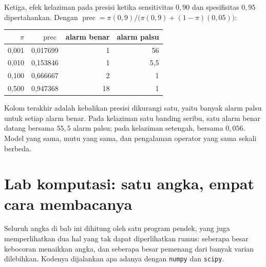 Ketiga, efek kelaziman pada presisi ketika sensitivitas $0{,}90$ dan spesifisitas $0{,}95$
dipertahankan. Dengan $\operatorname{prec}=\pi(0{,}9)/\bigl(\pi(0{,}9)+(1-\pi)(0{,}05)\bigr)$:

\begin{center}
\small
\begin{tabular}{rrrr}
\hline
$\pi$ & $\operatorname{prec}$ & alarm benar & alarm palsu \\
\hline
0,001 & 0,017699 & 1 & 56 \\
0,010 & 0,153846 & 1 & 5,5 \\
0,100 & 0,666667 & 2 & 1 \\
0,500 & 0,947368 & 18 & 1 \\
\hline
\end{tabular}
\end{center}

Kolom terakhir adalah kebalikan presisi dikurangi satu, yaitu banyak alarm palsu untuk
setiap alarm benar. Pada kelaziman satu banding seribu, satu alarm benar datang bersama
$55{,}5$ alarm palsu; pada kelaziman setengah, bersama $0{,}056$. Model yang sama, mutu
yang sama, dan pengalaman operator yang sama sekali berbeda.


\section{Lab komputasi: satu angka, empat cara membacanya}

Seluruh angka di bab ini dihitung oleh satu program pendek, yang juga memperlihatkan dua
hal yang tak dapat diperlihatkan rumus: seberapa besar kebocoran menaikkan angka, dan
seberapa besar pemenang dari banyak varian dilebihkan. Kodenya dijalankan apa adanya
dengan \texttt{numpy} dan \texttt{scipy}.

